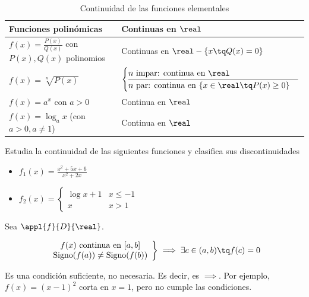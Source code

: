 \begin{table}[hbtp]
\begin{tabular}{|l|l|}
\hline
Funciones polinómicas & Continuas en $\real$\\\hline\hline
$f(x) = \frac{P(x)}{Q(x)}$ con $P(x),Q(x)$ polinomios& Continuas en $\real-\{x \tq Q(x)=0\}$\\\hline
$f(x) = \sqrt[n]{P(x)}$ & $\begin{cases}
n\text{ impar: continua en } \real\\\hline
n\text{ par: continua en } \{x\in\real\tq P(x) \geq 0\}\end{cases}$\\\hline
$f(x) = a^x$ con $a>0$ & Continua en $\real$\\\hline
$f(x) = \log_ax$ (con $a>0, a\neq 1$) & Continua en $\real$\\\hline
\end{tabular}
\label{tbl::ContinuidadFunElementales}
\caption{Continuidad de las funciones elementales}
\end{table}


\begin{problem}Estudia la continuidad de las siguientes funciones y clasifica sus discontinuidades

\begin{itemize}
	\item $f_1(x) = \displaystyle\frac{x^2+5x+6}{x^2+2x}$
	\item $f_2(x) = \begin{cases}\log{x+1} & x\leq -1\\x & x>1\end{cases}$
\end{itemize}
\solution
\end{problem}



\begin{theorem}
Sea $\appl{f}{D}{\real}$.

\[
\left.\begin{array}{c}f(x) \text{ continua en } [a,b]\\\text{Signo}(f(a))\neq \text{Signo}(f(b))\end{array}\right\}\implies \exists c\in(a,b) \tq f(c) = 0
\]

\end{theorem}
\obs Es una condición suficiente, no necesaria. Es decir, es $\implies $. Por ejemplo, $f(x) = (x-1)^2$ corta en $x=1$, pero no cumple las condiciones.

